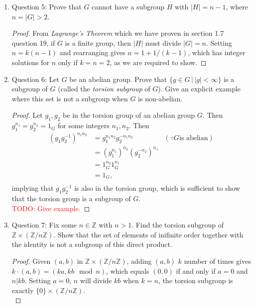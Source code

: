 \documentclass{article}
\newcommand{\TODO}[1]{\textcolor{red}{TODO: #1}}
\begin{document}
\begin{enumerate}
\begin{enumerate}
      \item Question 5: Prove that $G$ cannot have a subgroup $H$ with
        $|H|=n-1$, where $n=|G|>2$.

        \begin{proof}
          From \textit{Lagrange's Theorem} which we have proven in section
          1.7 question 19, if $G$ is a finite group, then $|H|$ must divide
          $|G|=n$. Setting $n=k(n-1)$ and rearranging gives $n=1+1/(k-1)$,
          which has integer solutions for $n$ only if $k=n=2$, as we are
          required to show.
        \end{proof}

      \item Question 6: Let $G$ be an abelian group. Prove that $\{g\in
        G\,|\,|g|<\infty\}$ is a subgroup of $G$ (called the
        \textit{torsion subgroup} of $G$). Give an explicit example
        where this set is not a subgroup when $G$ is non-abelian.

        \begin{proof}
          Let $g_1,g_2$ be in the torsion group of an abelian group $G$.
          Then $g_1^{n_1}=g_2^{n_2}=1_G$ for some integers $n_1,n_2$. Then
          \begin{align*}
            (g_1g_2^{-1})^{n_1n_2} & = g_1^{n_1n_2}g_2^{-n_1n_2} & (\because G \text{is abelian}) \\
                                   & = (g_1^{n_1})^{n_2}(g_2^{-n_2})^{n_1} & \\
                                   & = 1_G^{n_2}1_G^{n_1} & \\
                                   & = 1_G,               & \\
          \end{align*}
          implying that $g_1g_2^{-1}$ is also in the torsion group, which
          is sufficient to show that the torsion group is a subgroup of
          $G$. \\

          \TODO{Give example.}
        \end{proof}

      \item Question 7: Fix some $n\in\mathbb{Z}$ with $n>1$. Find the
        torsion subgroup of $\mathbb{Z}\times(\mathbb{Z}/n\mathbb{Z})$.
        Show that the set of elements of inifinite order together with the
        identity is not a subgroup of this direct product.

        \begin{proof}
          Given $(a,b)$ in $\mathbb{Z}\times(\mathbb{Z}/n\mathbb{Z})$,
          adding $(a,b)$ $k$ number of times gives $k\cdot(a,b)=(ka,kb\mod
          n)$, which equals $(0,0)$ if and only if $a=0$ and $n|kb$.
          Setting $a=0$, $n$ will divide $kb$ when $k=n$, the torsion
          subgroup is exactly $\{0\}\times(\mathbb{Z}/n\mathbb{Z})$. \\


\end{proof}
\end{enumerate}
\end{enumerate}
\end{document}
